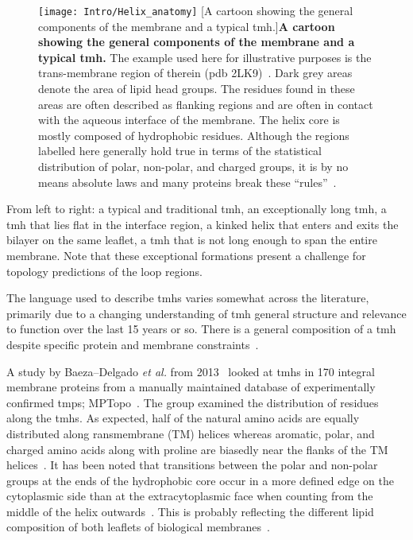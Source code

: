 \begin{figure}[!ht]
\centering
\texttt{[image: Intro/Helix\_anatomy]}
		[A cartoon showing the general components of the membrane and a typical \gls{tmh}.]{\textbf{A cartoon showing the general components of the membrane and a typical \gls{tmh}.}
The example used here for illustrative purposes is the trans-membrane region of therein (\gls{pdb} 2LK9)~\cite{Skasko2012}.
Dark grey areas denote the area of lipid head groups.
The residues found in these areas are often described as flanking regions and are often in contact with the aqueous interface of the membrane.
The helix core is mostly composed of hydrophobic residues.
Although the regions labelled here generally hold true in terms of the statistical distribution of polar, non-polar, and charged groups, it is by no means absolute laws and many proteins break these ``rules''~\cite{Sharpe2010, Baeza-Delgado2013, Pogozheva2013}.}

\label{fig:helixcartoon1}
\end{figure}


From left to right: a typical and traditional \gls{tmh}, an exceptionally long \gls{tmh}, a \gls{tmh} that lies flat in the interface region, a kinked helix that enters and exits the bilayer on the same leaflet, a \gls{tmh} that is not long enough to span the entire membrane.
Note that these exceptional formations present a challenge for topology predictions of the loop regions.

The language used to describe \gls{tmh}s varies somewhat across the literature, primarily due to a changing understanding of \gls{tmh} general structure and relevance to function over the last 15 years or so.
There is a general composition of a \gls{tmh} despite specific protein and membrane constraints~\cite{Sharpe2010}.

A study by Baeza\---Delgado \textit{ et al.} from 2013~\cite{Baeza-Delgado2013} looked at \gls{tmh}s in 170 integral membrane proteins from a manually maintained database of experimentally confirmed \gls{tmp}s; MPTopo~\cite{Jayasinghe2001}.
The group examined the distribution of residues along the \gls{tmh}s.
As expected, half of the natural amino acids are equally distributed along ransmembrane (TM) helices whereas aromatic, polar, and charged amino acids along with proline are biasedly near the flanks of the TM helices~\cite{Baeza-Delgado2013}.
It has been noted that transitions between the polar and non-polar groups at the ends of the hydrophobic core occur in a more defined edge on the cytoplasmic side than at the extracytoplasmic face when counting from the middle of the helix outwards~\cite{Baeza-Delgado2013}.
This is probably reflecting the different lipid composition of both leaflets of biological membranes~\cite{Baeza-Delgado2013}.

